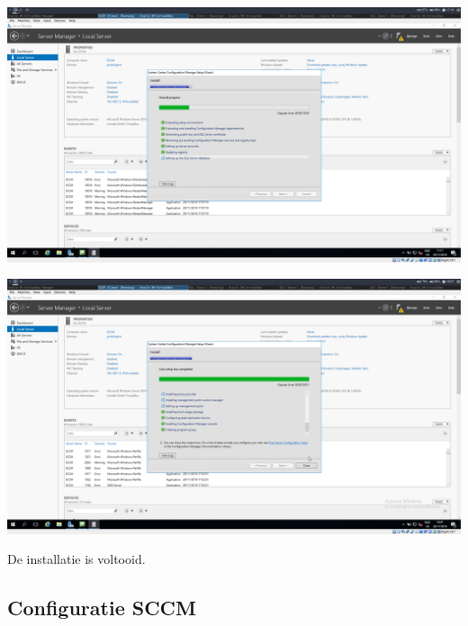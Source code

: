 \documentclass[a4paper]{article}
\begin{document}
\begin{center}
\includegraphics[width=15cm]{Pictures/SCCM/6/1543508319.png}


\end{center}
\begin{center}
\includegraphics[width=15cm]{Pictures/SCCM/6/1543511255.png}

De installatie is voltooid.
\end{center}
\subsection{Configuratie SCCM}
\end{document}
